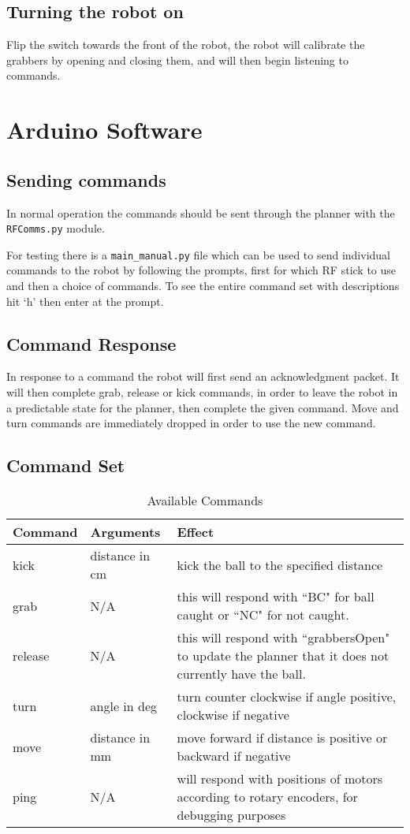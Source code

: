 \subsection{Turning the robot on}
Flip the switch towards the front of the robot, the robot will calibrate the grabbers by opening and closing them, and will then begin listening to commands.

\section{Arduino Software}
\subsection{Sending commands}
In normal operation the commands should be sent through the planner with the \texttt{RFComms.py} module. 

For testing there is a \texttt{main\_manual.py} file which can be used to send individual commands to the robot by following the 
prompts, first for which RF stick to use and then a choice of commands. To see the entire command set  with descriptions hit `h' then enter at the prompt. 


\subsection{Command Response}
In response to a command the robot will first send an acknowledgment packet. It will then complete grab, release or kick commands, in order to leave the robot in a predictable state for the planner, then complete the given command. Move and turn commands are immediately dropped in order to use the new command. 

\subsection{Command Set}
\begin{table}[H]
\begin{tabularx}{\textwidth}{ llX }
\toprule
\textbf{Command} & \textbf{Arguments} & \textbf{Effect} \\
\midrule
kick & distance in cm & kick the ball to the specified distance\\
grab & N/A & this will respond with ``BC" for ball caught or ``NC" for not caught. \\
release & N/A & this will respond with ``grabbersOpen" to update the planner that it does not currently have the ball. \\
turn & angle in deg & turn counter clockwise if angle positive, clockwise if negative\\
move & distance in mm & move forward if distance is positive or backward if negative \\
ping & N/A &  will respond with positions of motors according to rotary encoders, for debugging purposes \\
\bottomrule
\end{tabularx}
\caption{Available Commands}
\end{table}

